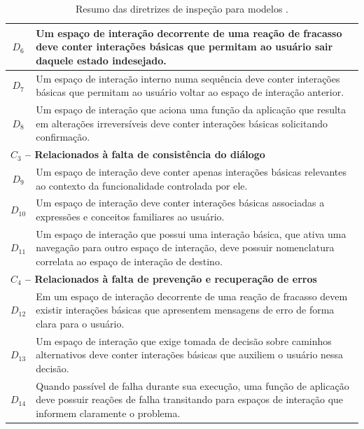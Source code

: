 \begin{table}[!htb]
\begin{center}
\begin{tabular}{|c|m{145mm}|}
      $D_{6}$ &  Um espaço  de interação decorrente  de uma  reação de
      fracasso deve conter interações  básicas que permitam ao usuário
      sair daquele estado indesejado. \\ \hline

      $D_{7}$  & Um espaço  de interação  interno numa  sequência deve
      conter  interações básicas  que  permitam ao  usuário voltar  ao
      espaço de interação anterior. \\ \hline

      $D_{8}$  & Um  espaço  de  interação que  aciona  uma função  da
      aplicação  que resulta em  alterações irreversíveis  deve conter
      interações básicas solicitando confirmação. \\ \hline

      \multicolumn{2}{|l|}{\bf  $C_3$  --   Relacionados  à  falta  de
        consistência do diálogo} \\ \hline

      $D_{9}$ &  Um espaço de interação deve  conter apenas interações
      básicas relevantes ao  contexto da funcionalidade controlada por
      ele. \\ \hline

      $D_{10}$ & Um espaço de interação deve conter interações básicas
      associadas  a  expressões  e  conceitos familiares  ao  usuário.
      \\ \hline
   
      $D_{11}$  & Um  espaço  de interação  que  possui uma  interação
      básica, que ativa uma  navegação para outro espaço de interação,
      deve possuir  nomenclatura correlata  ao espaço de  interação de
      destino.  \\ \hline

      \multicolumn{2}{|l|}{\bf  $C_4$  --   Relacionados  à  falta  de
        prevenção e recuperação de erros} \\ \hline

      $D_{12}$ & Em um espaço de interação decorrente de uma reação de
      fracasso  devem   existir  interações  básicas   que  apresentem
      mensagens de erro de forma clara para o usuário. \\ \hline

      $D_{13}$ &  Um espaço de  interação que exige tomada  de decisão
      sobre caminhos  alternativos deve conter  interações básicas que
      auxiliem o usuário nessa decisão. \\ \hline

      $D_{14}$ &  Quando passível de  falha durante sua  execução, uma
      função de  aplicação deve  possuir reações de  falha transitando
      para   espaços   de   interação   que  informem   claramente   o
      problema. \\ \hline

    \end{tabular}
    \caption{Resumo das diretrizes de inspeção para modelos \aladim.}
    \label{tab:inspectionGuidelines}
  \end{center}
\end{table}

